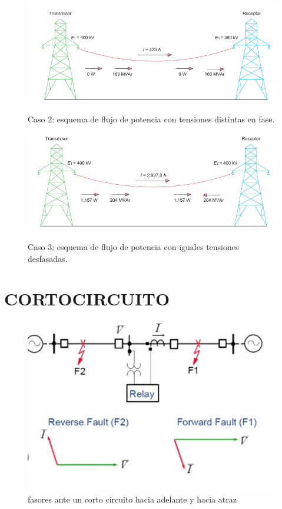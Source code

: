 \documentclass[a5paper]{book}%
\begin{document}
\begin{figure}[H]
  \centering
  \caption{Caso 2: esquema de flujo de potencia con tensiones distintas en
    fase.}
  \includegraphics[width=\linewidth]{tensiones_distintas_igual_fase}
  \label{fig:caso2}
\end{figure}

\begin{figure}[H]
  \centering
  \caption{Caso 3: esquema de flujo de potencia con iguales tensiones
    desfasadas.}
  \includegraphics[width=\linewidth]{tensionesigualesdesfasadas}
  \label{fig:caso3}
\end{figure}

\section{CORTOCIRCUITO}

\begin{figure}[H]
  \centering
  \caption{fasores ante un corto circuito hacia adelante y hacia atraz}
  \label{fig:fasores}
  \includegraphics[width=\linewidth]{cortcircuito}
  \end{figure}
\end{document}
